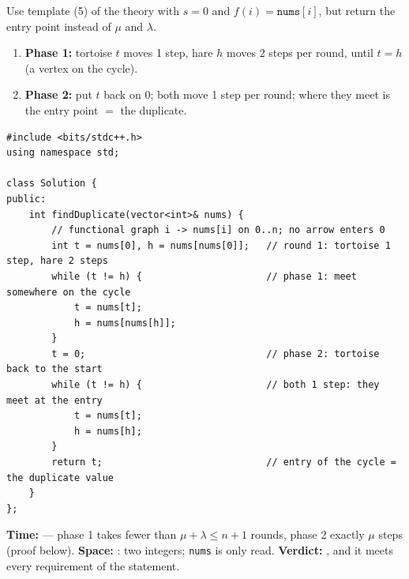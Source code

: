 \begin{algorithmbox}
Use template (5) of the theory with $s = 0$ and $f(i) = \texttt{nums}[i]$, but return the entry point instead of $\mu$ and $\lambda$.
\begin{enumerate}[leftmargin=*]
    \item \textbf{Phase 1:} tortoise $t$ moves 1 step, hare $h$ moves 2 steps per round, until $t = h$ (a vertex on the cycle).
    \item \textbf{Phase 2:} put $t$ back on $0$; both move 1 step per round; where they meet is the entry point $=$ the duplicate.
\end{enumerate}

\begin{lstlisting}[style=cpp]
#include <bits/stdc++.h>
using namespace std;

class Solution {
public:
    int findDuplicate(vector<int>& nums) {
        // functional graph i -> nums[i] on 0..n; no arrow enters 0
        int t = nums[0], h = nums[nums[0]];   // round 1: tortoise 1 step, hare 2 steps
        while (t != h) {                      // phase 1: meet somewhere on the cycle
            t = nums[t];
            h = nums[nums[h]];
        }
        t = 0;                                // phase 2: tortoise back to the start
        while (t != h) {                      // both 1 step: they meet at the entry
            t = nums[t];
            h = nums[h];
        }
        return t;                             // entry of the cycle = the duplicate value
    }
};
\end{lstlisting}

\begin{complexitybox}
\textbf{Time:}  --- phase 1 takes fewer than $\mu + \lambda \le n+1$ rounds, phase 2 exactly $\mu$ steps (proof below). \textbf{Space:} : two integers; \texttt{nums} is only read. \textbf{Verdict:} \ac{}, and it meets every requirement of the statement.
\end{complexitybox}
\end{algorithmbox}

